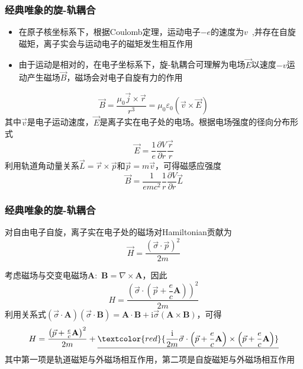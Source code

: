{\frame
{
	\frametitle{经典唯象的旋-轨耦合}
	\begin{itemize}
		\item 在原子核坐标系下，根据\textrm{Coulomb}定理，运动电子$-e$的速度为$v$~,并存在自旋磁矩，离子实会与运动电子的磁矩发生相互作用
		\item 由于运动是相对的，在电子坐标系下，旋-轨耦合可理解为电场$\vec E$以速度$-v$运动产生磁场$\vec B$，磁场会对电子自旋有力的作用
	\end{itemize}
	\begin{displaymath}
		\vec B=\frac{\mu_0\vec j\times\vec r}{r^3}=\mu_0\varepsilon_0(\vec v\times\vec E)
	\end{displaymath}
其中$\vec v$是电子运动速度，$\vec E$是离子实在电子处的电场。根据电场强度的径向分布形式
\begin{displaymath}
	\vec E=\frac1{e}\frac{\partial V}{\partial r}\frac{\vec r}r
\end{displaymath}
利用轨道角动量关系$\vec L=\vec r\times\vec p$和$\vec p=m\vec v$，可得磁感应强度
\begin{displaymath}
	\vec B=\frac1{emc^2}\frac1r\frac{\partial V}{\partial r}\vec L
\end{displaymath}
}

\frame
{
	\frametitle{经典唯象的旋-轨耦合}
对自由电子自旋，离子实在电子处的磁场对\textrm{Hamiltonian}贡献为
\begin{displaymath}
	\vec H=\frac{(\vec{\sigma}\cdot\vec p)^2}{2m}
\end{displaymath}

考虑磁场与交变电磁场$\mathbf{A}$:~$\mathbf B=\nabla\times\mathbf A$，因此
\begin{displaymath}
	H=\frac{\left( \vec{\sigma}\cdot\left( \vec p+\dfrac ec\mathbf A \right) \right)^2}{2m}
\end{displaymath}
利用关系式$(\vec{\sigma}\cdot\mathbf A)(\vec{\sigma}\cdot\mathbf B)=\mathbf{A}\cdot\mathbf{B}+\mathrm{i}\vec{\sigma}(\mathbf{A}\times\mathbf{B})$，可得
\begin{displaymath}
	H=\frac{\left( \vec p+\frac ec\mathbf{A} \right)^2}{2m}+\underline{\textcolor{red}{\frac{\mathrm i}{2m}\vec{\sigma}\cdot\left( \vec p+\frac ec\mathbf{A} \right)\times\left( \vec p+\frac ec\mathbf{A} \right)}}
\end{displaymath}
其中第一项是轨道磁矩与外磁场相互作用，第二项是自旋磁矩与外磁场相互作用
}

}
